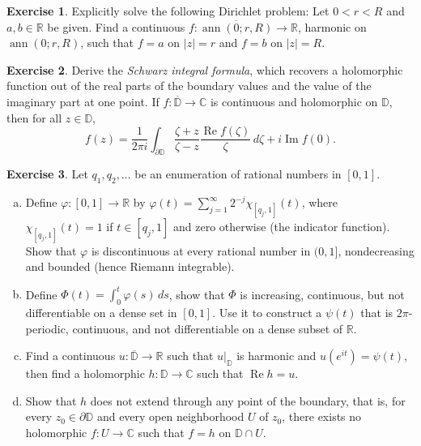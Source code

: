 \documentclass[12pt,openany]{book}
\newcommand{\ann}{\operatorname{ann}}
\renewcommand{\Re}{\operatorname{Re}}
\renewcommand{\Im}{\operatorname{Im}}
\newcommand{\sabs}[1]{\lvert {#1} \rvert}
\newcommand{\C}{{\mathbb{C}}}
\newcommand{\R}{{\mathbb{R}}}
\newcommand{\D}{{\mathbb{D}}}
\newcommand{\myindex}[1]{#1\index{#1}}
\theoremstyle{plain}
\theoremstyle{remark}
\theoremstyle{definition}
\newenvironment{exbox}{%
    \def\FrameCommand{\vrule width 1pt \relax\hspace{10pt}}%
    \MakeFramed{\advance\hsize-\width\FrameRestore}%
}{%
    \endMakeFramed
}
\newenvironment{exparts}{%
    \leavevmode\begin{enumerate}[a),noitemsep,topsep=0pt,parsep=0pt,partopsep=0pt]
}{%
    \end{enumerate}
}
\theoremstyle{exercise}
\newtheorem{exercise}{Exercise}[section]
\theoremstyle{example}
\begin{document}
\begin{exbox}
\begin{exercise}
Explicitly solve the following Dirichlet problem:  Let $0 < r < R$ and $a,b
\in \R$ be given.  Find a continuous $f \colon \overline{\ann(0;r,R)} \to
\R$, harmonic on $\ann(0;r,R)$, such that $f=a$ on $\sabs{z}=r$ and $f=b$
on $\sabs{z}=R$.
\end{exercise}

\begin{exercise}
Derive the \emph{\myindex{Schwarz integral formula}}, which recovers
a holomorphic function out of the real parts of the boundary values
and the value of the imaginary part at one point.
If $f \colon \overline{\D} \to \C$ is continuous and holomorphic on
$\D$, then for all $z \in \D$,
\begin{equation*}
f(z) =
\frac{1}{2\pi i}
\int_{\partial \D}
\frac{\zeta+z}{\zeta-z} \frac{\Re f(\zeta)}{\zeta} \, d\zeta
+ i \Im f(0) .
\end{equation*}
\end{exercise}

\begin{exercise}
Let $q_1,q_2,\ldots$ be an enumeration of rational
numbers in $[0,1]$.
\begin{exparts}
\item
Define $\varphi \colon [0,1] \to {\mathbb R}$
by $\varphi(t) = \sum_{j=1}^\infty 2^{-j} \chi_{[q_j,1]}(t)$,
where $\chi_{[q_j,1]}(t) = 1$ if $t \in [q_j,1]$ and
zero otherwise (the indicator function).  Show that
$\varphi$ is discontinuous at every rational number in $(0,1]$,
nondecreasing and bounded (hence Riemann integrable).
\item
Define $\Phi(t) = \int_0^t \varphi(s)\, ds$, show that $\Phi$
is increasing, continuous, but not differentiable
on a dense set in $[0,1]$.  Use it to construct a
$\psi(t)$ that is $2\pi$-periodic, continuous, and 
not differentiable on a dense subset of $\R$.
\item
Find a continuous $u \colon \overline{\D} \to \R$
such that $u|_{\D}$ is harmonic and
$u(e^{it}) = \psi(t)$, then find a holomorphic $h \colon \D \to \C$
such that $\Re h = u$.
\item
Show that $h$ does not extend through any point of
the boundary, that is, for every
$z_0 \in \partial \D$ and every open neighborhood
$U$ of $z_0$, there exists no holomorphic $f \colon U \to \C$
such that $f = h$ on $\D \cap U$.
\end{exparts}
\end{exercise}
\end{exbox}
\end{document}

